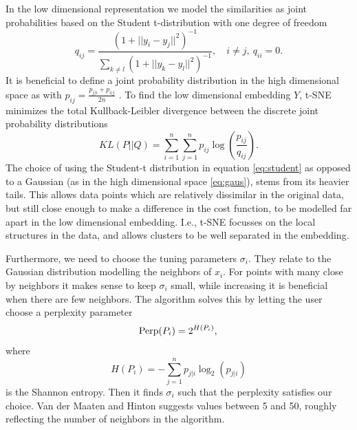 \documentclass[a4paper, 10pt]{memoir}
\theoremstyle{plain}
\theoremstyle{definition}
\theoremstyle{remark}
\begin{document}
In the low dimensional representation we model the similarities as joint probabilities based on the Student t-distribution with one degree of freedom
\begin{equation}\label{eq:student}
        q_{ij} = \frac{(1 + ||y_i - y_j||^2)^{-1}}{\sum_{k \neq  l}^{}(1 + ||y_k - y_l||^2)^{-1}}, \quad i \neq  j, \ q_{ii} = 0.
\end{equation}
It is beneficial to define a joint probability distribution in the high dimensional space as with $p_{ij}= \frac{p_{j|i} + p_{i|j}}{2n}$ \cite{hinton}.
To find the low dimensional embedding $Y$, t-SNE minimizes the total Kullback-Leibler divergence between the discrete joint probability distributions 
\begin{equation}\label{eq:KL}
        KL(P||Q) = \sum_{i = 1}^{n}\sum_{j = 1}^{n} p_{ij}\log \left( \frac{p_{ij}}{q_{ij}} \right).
\end{equation}
The choice of using the Student-t distribution in equation \eqref{eq:student} as opposed to a Gaussian (as in the high dimensional space \eqref{eq:gaus}), stems from its heavier tails.
This allows data points which are relatively dissimilar in the original data, but still close enough to make a difference in the cost function, to be modelled far apart in the low dimensional embedding.
I.e., t-SNE focusses on the local structures in the data, and allows clusters to be well separated in the embedding.

Furthermore, we need to choose the tuning parameters $\sigma_i$.
They relate to the Gaussian distribution modelling the neighbors of $x_i$.
For points with many close by neighbors it makes sense to keep $\sigma_i$ small, while increasing it is beneficial when there are few neighbors.
The algorithm solves this by letting the user choose a perplexity parameter
\begin{equation}\label{eq:perp}
        \text{Perp}(P_i) = 2^{H(P_i)}, \\
\end{equation}
where 
\begin{equation*}
        H(P_i) = -\sum_{j = 1}^{n} p_{j|i}\log_2(p_{j|i})
\end{equation*}
is the Shannon entropy.
Then it finds $\sigma_i$ such that the perplexity satisfies our choice.
Van der Maaten and Hinton \cite{hinton} suggests values between 5 and 50, roughly reflecting the number of neighbors in the algorithm.
\end{document}
